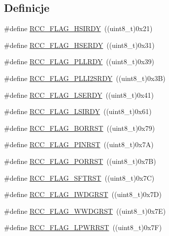\subsection*{Definicje}
\begin{DoxyCompactItemize}
\item 
\#define \hyperlink{group___r_c_c___flag_ga827d986723e7ce652fa733bb8184d216}{R\+C\+C\+\_\+\+F\+L\+A\+G\+\_\+\+H\+S\+I\+R\+DY}~((uint8\+\_\+t)0x21)
\item 
\#define \hyperlink{group___r_c_c___flag_ga173edf47bec93cf269a0e8d0fec9997c}{R\+C\+C\+\_\+\+F\+L\+A\+G\+\_\+\+H\+S\+E\+R\+DY}~((uint8\+\_\+t)0x31)
\item 
\#define \hyperlink{group___r_c_c___flag_gaf82d8afb18d9df75db1d6c08b9c50046}{R\+C\+C\+\_\+\+F\+L\+A\+G\+\_\+\+P\+L\+L\+R\+DY}~((uint8\+\_\+t)0x39)
\item 
\#define \hyperlink{group___r_c_c___flag_ga31e67a9f19cf673acf196d19f443f3d5}{R\+C\+C\+\_\+\+F\+L\+A\+G\+\_\+\+P\+L\+L\+I2\+S\+R\+DY}~((uint8\+\_\+t)0x3\+B)
\item 
\#define \hyperlink{group___r_c_c___flag_gac9fb963db446c16e46a18908f7fe1927}{R\+C\+C\+\_\+\+F\+L\+A\+G\+\_\+\+L\+S\+E\+R\+DY}~((uint8\+\_\+t)0x41)
\item 
\#define \hyperlink{group___r_c_c___flag_ga8c5e4992314d347597621bfe7ab10d72}{R\+C\+C\+\_\+\+F\+L\+A\+G\+\_\+\+L\+S\+I\+R\+DY}~((uint8\+\_\+t)0x61)
\item 
\#define \hyperlink{group___r_c_c___flag_ga23d5211abcdf0e397442ca534ca04bb4}{R\+C\+C\+\_\+\+F\+L\+A\+G\+\_\+\+B\+O\+R\+R\+ST}~((uint8\+\_\+t)0x79)
\item 
\#define \hyperlink{group___r_c_c___flag_gabfc3ab5d4a8a94ec1c9f38794ce37ad6}{R\+C\+C\+\_\+\+F\+L\+A\+G\+\_\+\+P\+I\+N\+R\+ST}~((uint8\+\_\+t)0x7\+A)
\item 
\#define \hyperlink{group___r_c_c___flag_ga39ad309070f416720207eece5da7dc2c}{R\+C\+C\+\_\+\+F\+L\+A\+G\+\_\+\+P\+O\+R\+R\+ST}~((uint8\+\_\+t)0x7\+B)
\item 
\#define \hyperlink{group___r_c_c___flag_gaf7852615e9b19f0b2dbc8d08c7594b52}{R\+C\+C\+\_\+\+F\+L\+A\+G\+\_\+\+S\+F\+T\+R\+ST}~((uint8\+\_\+t)0x7\+C)
\item 
\#define \hyperlink{group___r_c_c___flag_gaac46bac8a97cf16635ff7ffc1e6c657f}{R\+C\+C\+\_\+\+F\+L\+A\+G\+\_\+\+I\+W\+D\+G\+R\+ST}~((uint8\+\_\+t)0x7\+D)
\item 
\#define \hyperlink{group___r_c_c___flag_gaa80b60b2d497ccd7b7de1075009999a7}{R\+C\+C\+\_\+\+F\+L\+A\+G\+\_\+\+W\+W\+D\+G\+R\+ST}~((uint8\+\_\+t)0x7\+E)
\item 
\#define \hyperlink{group___r_c_c___flag_ga67049531354aed7546971163d02c9920}{R\+C\+C\+\_\+\+F\+L\+A\+G\+\_\+\+L\+P\+W\+R\+R\+ST}~((uint8\+\_\+t)0x7\+F)
\end{DoxyCompactItemize}


